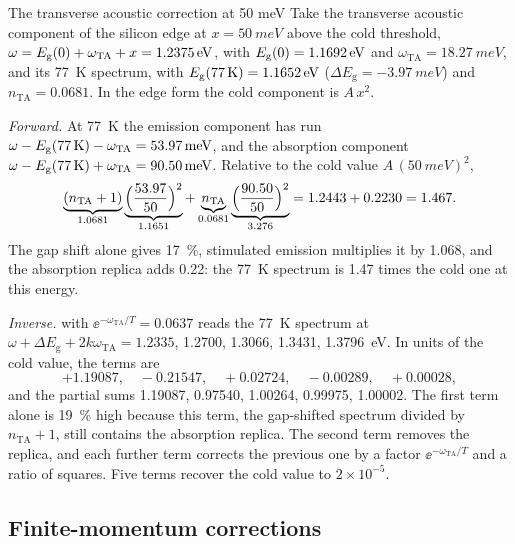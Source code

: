 \begin{workedexample}{The transverse acoustic correction at 50 meV}\label{we:13-TA-transfer}
Take the transverse acoustic component of the silicon edge at $x = \SI{50}{meV}$ above the cold threshold, $\omega = E_{\mathrm{g}}(0) + \omega_{\mathrm{TA}} + x = \SI{1.2375}{eV}$, with $E_{\mathrm{g}}(0) = \SI{1.1692}{eV}$ and $\omega_{\mathrm{TA}} = \SI{18.27}{meV}$, and its \SI{77}{K} spectrum, with $E_{\mathrm{g}}(\SI{77}{K}) = \SI{1.1652}{eV}$ ($\Delta E_{\mathrm{g}} = \SI{-3.97}{meV}$) and $n_{\mathrm{TA}} = 0.0681$. In the edge form the cold component is $A\,x^2$.

\emph{Forward.} At \SI{77}{K} the emission component has run $\omega - E_{\mathrm{g}}(\SI{77}{K}) - \omega_{\mathrm{TA}} = \SI{53.97}{meV}$, and the absorption component $\omega - E_{\mathrm{g}}(\SI{77}{K}) + \omega_{\mathrm{TA}} = \SI{90.50}{meV}$. Relative to the cold value $A\,(\SI{50}{meV})^2$,
\begin{equation*}
  \underbrace{(n_{\mathrm{TA}} + 1)}_{1.0681}\underbrace{\Bigl(\frac{53.97}{50}\Bigr)^2}_{1.1651} + \underbrace{n_{\mathrm{TA}}}_{0.0681}\underbrace{\Bigl(\frac{90.50}{50}\Bigr)^2}_{3.276} = 1.2443 + 0.2230 = 1.467 .
\end{equation*}
The gap shift alone gives \SI{17}{\percent}, stimulated emission multiplies it by 1.068, and the absorption replica adds 0.22: the \SI{77}{K} spectrum is 1.47 times the cold one at this energy.

\emph{Inverse.}  with $\ee^{-\omega_{\mathrm{TA}}/T} = 0.0637$ reads the \SI{77}{K} spectrum at $\omega + \Delta E_{\mathrm{g}} + 2k\omega_{\mathrm{TA}} = 1.2335$, 1.2700, 1.3066, 1.3431, \SI{1.3796}{eV}. In units of the cold value, the terms are
\begin{equation*}
  +1.19087,\quad -0.21547,\quad +0.02724,\quad -0.00289,\quad +0.00028 ,
\end{equation*}
and the partial sums 1.19087, 0.97540, 1.00264, 0.99975, 1.00002. The first term alone is \SI{19}{\percent} high because this term, the gap-shifted spectrum divided by $n_{\mathrm{TA}} + 1$, still contains the absorption replica. The second term removes the replica, and each further term corrects the previous one by a factor $\ee^{-\omega_{\mathrm{TA}}/T}$ and a ratio of squares. Five terms recover the cold value to $2\times10^{-5}$.
\end{workedexample}

\subsection{Finite-momentum corrections}

